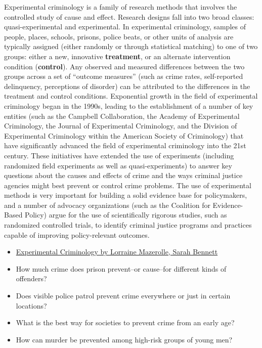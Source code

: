 \documentclass[]{book}
\theoremstyle{definition}
\theoremstyle{definition}
\theoremstyle{definition}
\theoremstyle{remark}
\begin{document}
Experimental criminology is a family of research methods that involves
the controlled study of cause and effect. Research designs fall into two
broad classes: quasi-experimental and experimental. In experimental
criminology, samples of people, places, schools, prisons, police beats,
or other units of analysis are typically assigned (either randomly or
through statistical matching) to one of two groups: either a new,
innovative \textbf{treatment}, or an alternate intervention condition
(\textbf{control}). Any observed and measured differences between the
two groups across a set of ``outcome measures'' (such as crime rates,
self-reported delinquency, perceptions of disorder) can be attributed to
the differences in the treatment and control conditions. Exponential
growth in the field of experimental criminology began in the 1990s,
leading to the establishment of a number of key entities (such as the
Campbell Collaboration, the Academy of Experimental Criminology, the
Journal of Experimental Criminology, and the Division of Experimental
Criminology within the American Society of Criminology) that have
significantly advanced the field of experimental criminology into the
21st century. These initiatives have extended the use of experiments
(including randomized field experiments as well as quasi-experiments) to
answer key questions about the causes and effects of crime and the ways
criminal justice agencies might best prevent or control crime problems.
The use of experimental methods is very important for building a solid
evidence base for policymakers, and a number of advocacy organizations
(such as the Coalition for Evidence- Based Policy) argue for the use of
scientifically rigorous studies, such as randomized controlled trials,
to identify criminal justice programs and practices capable of improving
policy-relevant outcomes.

\begin{itemize}
\item
  \href{http://www.oxfordbibliographies.com/view/document/obo-9780195396607/obo-9780195396607-0085.xml}{Experimental
  Criminology by Lorraine Mazerolle, Sarah Bennett}
\item
  How much crime does prison prevent--or cause--for different kinds of
  offenders?
\item
  Does visible police patrol prevent crime everywhere or just in certain
  locations?
\item
  What is the best way for societies to prevent crime from an early age?
\item
  How can murder be prevented among high-risk groups of young men?
\end{itemize}
\end{document}
